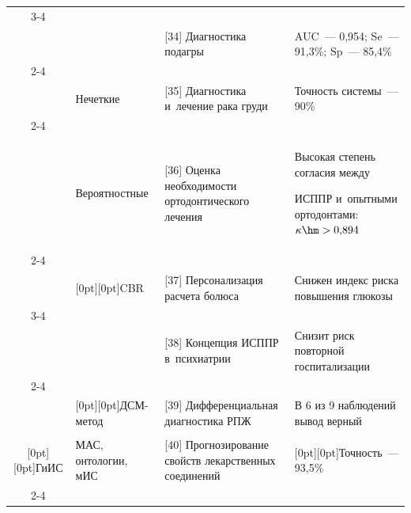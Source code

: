 \begin{table}
{\begin{sideways}
\begin{tabular}{|c|p{22mm}|p{58mm}|p{65mm}|}
\cline{3-4}

&&&\\[-8pt]

&&[34] Диагностика подагры &AUC~--- 0,954; Se~--- 91,3\%; Sp~--- 85,4\%\\

\cline{2-4}

&&&\\[-8pt]

&Нечеткие&[35] Диагностика и~лечение рака груди&Точность системы~--- 90\%\\

\cline{2-4}

&&&\\[-8pt]

&Веро\-ят\-ност\-ные&[36] Оценка необходимости ортодонтического лечения &Высокая степень согласия между 

ИСППР и~опытными ортодонтами: $\kappa \hm> 0{,}894$\\

\cline{2-4}

&&&\\[-8pt]

&\multicolumn{1}{l|}{\raisebox{-6pt}[0pt][0pt]{CBR}}&[37] Персонализация расчета болюса&Снижен индекс риска повышения глюкозы \\

\cline{3-4}

&&&\\[-8pt]

&&[38] Концепция ИСППР в~пси\-хи\-ат\-рии&Снизит риск повторной госпитализации \\

\cline{2-4}

&&&\\[-8pt]

&\multicolumn{1}{l|}{\raisebox{-6pt}[0pt][0pt]{ДСМ-метод}}&[39] Дифференциальная диагностика РПЖ &В 6 из 9 наблюдений вывод верный\\

\hline

&&&\\[-8pt]

\multicolumn{1}{|c|}{\raisebox{-28pt}[0pt][0pt]{ГиИС}}&МАС, онтологии, мИС&[40] Прогнозирование свойств лекарственных соединений&

\multicolumn{1}{l|}{\raisebox{-4pt}[0pt][0pt]{Точность~---  93,5\%}}\\

\cline{2-4}

&&&\\[-8pt]


\end{tabular}
\end{sideways}}
\end{table}
